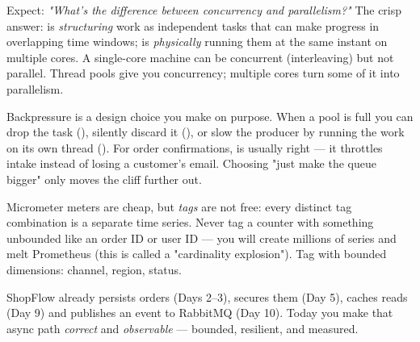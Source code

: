 \begin{interview}
Expect: \emph{"What's the difference between concurrency and parallelism?"} The crisp answer:  is \emph{structuring} work as independent tasks that can make progress in overlapping time windows;  is \emph{physically} running them at the same instant on multiple cores. A single-core machine can be concurrent (interleaving) but not parallel. Thread pools give you concurrency; multiple cores turn some of it into parallelism.
\end{interview}

\begin{seniornote}
Backpressure is a design choice you make on purpose. When a pool is full you can drop the task (), silently discard it (), or slow the producer by running the work on its own thread (). For order confirmations,  is usually right --- it throttles intake instead of losing a customer's email. Choosing "just make the queue bigger" only moves the cliff further out.
\end{seniornote}

\begin{prodtip}
Micrometer meters are cheap, but \emph{tags} are not free: every distinct tag combination is a separate time series. Never tag a counter with something unbounded like an order ID or user ID --- you will create millions of series and melt Prometheus (this is called a "cardinality explosion"). Tag with bounded dimensions: channel, region, status.
\end{prodtip}


ShopFlow already persists orders (Days 2--3), secures them (Day 5), caches reads (Day 9) and publishes an  event to RabbitMQ (Day 10). Today you make that async path \emph{correct} and \emph{observable} --- bounded, resilient, and measured.

